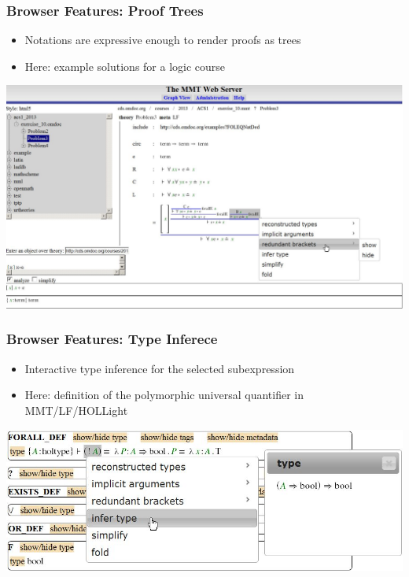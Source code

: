 \documentclass{beamer}
\begin{document}
\begin{frame}\frametitle{Browser Features: Proof Trees}
\begin{itemize}
\item Notations are expressive enough to render proofs as trees
\item Here: example solutions for a logic course
\end{itemize}

\includegraphics[width=\textwidth]{img/web-big.jpg}
\end{frame}

\begin{frame}\frametitle{Browser Features: Type Inferece}
\begin{itemize}
\item Interactive type inference for the selected subexpression
\item Here: definition of the polymorphic universal quantifier in MMT/LF/HOLLight
\end{itemize}

\includegraphics[width=\textwidth]{img/type-inference.jpg}
\end{frame}
\end{document}
